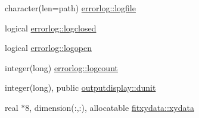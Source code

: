 \begin{DoxyCompactItemize}
\item 
character(len=path) \hyperlink{namespaceerrorlog_a42e82497abf38d3e1683b51b48a5e4c0}{errorlog\+::logfile}
\item 
logical \hyperlink{namespaceerrorlog_af9add736038cc71b13ee19df6544f3e5}{errorlog\+::logclosed}
\item 
logical \hyperlink{namespaceerrorlog_a3a12f9c3cbb079a8cbb7b5790ea2c827}{errorlog\+::logopen}
\item 
integer(long) \hyperlink{namespaceerrorlog_a056ccc9457985050fb6391dd4abf1f2c}{errorlog\+::logcount}
\item 
integer(long), public \hyperlink{namespaceoutputdisplay_a37a1610ae7e198bc24d119cea584a6f2}{outputdisplay\+::dunit}
\item 
real $\ast$8, dimension(\+:,\+:), allocatable \hyperlink{namespacefitxydata_ad69a6716eab16a1f8c170a0d0a7ed499}{fitxydata\+::xydata}
\end{DoxyCompactItemize}

